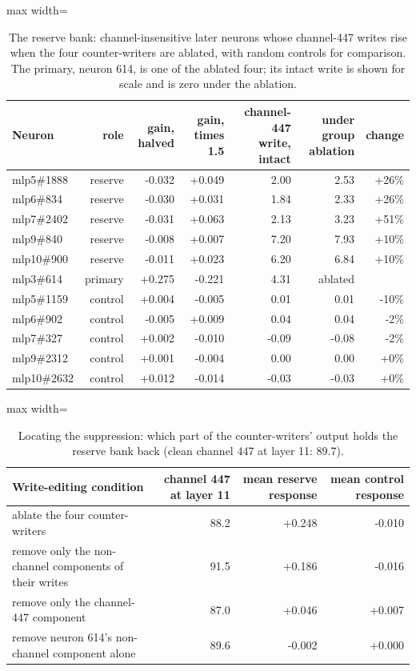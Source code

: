 \begin{table}[H]\centering\footnotesize
\caption{The reserve bank: channel-insensitive later neurons whose channel-447 writes rise when the four counter-writers are ablated, with random controls for comparison. The primary, neuron 614, is one of the ablated four; its intact write is shown for scale and is zero under the ablation.}\label{app:reserves}
\begin{adjustbox}{max width=\linewidth}
\begin{tabular}{lrrrrrr}\toprule
Neuron & role & gain, halved & gain, times 1.5 & channel-447 write, intact & under group ablation & change \\ \midrule
mlp5\#1888 & reserve & -0.032 & +0.049 & 2.00 & 2.53 & +26\% \\
mlp6\#834 & reserve & -0.030 & +0.031 & 1.84 & 2.33 & +26\% \\
mlp7\#2402 & reserve & -0.031 & +0.063 & 2.13 & 3.23 & +51\% \\
mlp9\#840 & reserve & -0.008 & +0.007 & 7.20 & 7.93 & +10\% \\
mlp10\#900 & reserve & -0.011 & +0.023 & 6.20 & 6.84 & +10\% \\
mlp3\#614 & primary & +0.275 & -0.221 & 4.31 & ablated &  \\
mlp5\#1159 & control & +0.004 & -0.005 & 0.01 & 0.01 & -10\% \\
mlp6\#902 & control & -0.005 & +0.009 & 0.04 & 0.04 & -2\% \\
mlp7\#327 & control & +0.002 & -0.010 & -0.09 & -0.08 & -2\% \\
mlp9\#2312 & control & +0.001 & -0.004 & 0.00 & 0.00 & +0\% \\
mlp10\#2632 & control & +0.012 & -0.014 & -0.03 & -0.03 & +0\% \\
\bottomrule\end{tabular}\end{adjustbox}
\end{table}
\begin{table}[H]\centering\small
\caption{Locating the suppression: which part of the counter-writers' output holds the reserve bank back (clean channel 447 at layer 11: 89.7).}\label{app:leash}
\begin{adjustbox}{max width=\linewidth}
\begin{tabular}{lrrr}\toprule
Write-editing condition & channel 447 at layer 11 & mean reserve response & mean control response \\ \midrule
ablate the four counter-writers & 88.2 & +0.248 & -0.010 \\
remove only the non-channel components of their writes & 91.5 & +0.186 & -0.016 \\
remove only the channel-447 component & 87.0 & +0.046 & +0.007 \\
remove neuron 614's non-channel component alone & 89.6 & -0.002 & +0.000 \\
\bottomrule\end{tabular}\end{adjustbox}
\end{table}
